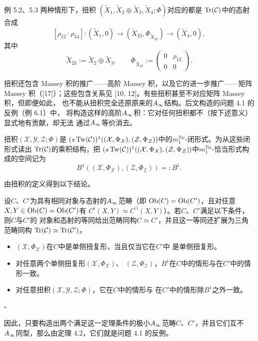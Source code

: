 例 5.2、5.3 两种情形下，扭积
$(\tilde{X}_{1},\tilde{X}_{2}\oplus\tilde{X}_{3},\tilde{X}_{4};\Phi)$对应的都是
$\operatorname{Tr}(\mathcal{C})$中的态射合成
\[
[\rho_{12}\cdot\rho_{34}]:(\tilde{X}_{1},0)\longrightarrow
(\tilde{X}_{23},\Phi_{\tilde{X}_{23}})\longrightarrow(\tilde{X}_{4},0),
\]
其中
\[
\tilde{X}_{23}:=\tilde{X}_{2}\oplus\tilde{X}_{3},\qquad
\Phi_{\tilde{X}_{23}}:=
\begin{pmatrix}0&\rho_{12}\\0&0\end{pmatrix}.
\]


扭积还包含 Massey 积的推广——高阶 Massey 积，以及它的进一步推广——矩阵
Massey 积（[17]）；这些包含关系见 [10, 12]。有些扭积甚至不对应矩阵 Massey 积，但即便如此，
也不能从扭积完全还原原来的$A_{\infty}$结构。后文构造的问题 4.1 的反例（例 6.1）中，
将构造这样的高阶$A_{\infty}$积：它对任何扭积都不（按下述意义）显式地有贡献，却无法
通过$A_{\infty}$等价消去。

扭积$(\mathcal{X},\mathcal{Y},\mathcal{Z};\Phi)$是
$(s\operatorname{Tw}(\mathcal{C}))^{1}((\mathcal{X},\Phi_{\mathcal{X}}),
(\mathcal{Z},\Phi_{\mathcal{Z}}))$中的$m_{1}^{Tw}$-闭形式。为从这些闭形式读出
$\operatorname{Tr}(\mathcal{C})$的乘积结构，把
$(s\operatorname{Tw}(\mathcal{C}))^{1}((\mathcal{X},\Phi_{\mathcal{X}}),
(\mathcal{Z},\Phi_{\mathcal{Z}}))$中$m_{1}^{Tw}$-恰当形式构成的空间记为
\[
B^{1}((\mathcal{X},\Phi_{\mathcal{X}}),(\mathcal{Z},\Phi_{\mathcal{Z}}))=:B^{1}.
\]

由扭积的定义得到以下结论。

\begin{theorem}\label{thm:c04-5.4}
设$C$、$C'$为具有相同对象与态射的$A_{\infty}$范畴（即
$\operatorname{Ob}(C)=\operatorname{Ob}(C')$，且对任意$X,Y\in\operatorname{Ob}(C)=\operatorname{Ob}(C')$有
$C^{i}(X,Y)\simeq C^{\prime i}(X,Y)$）。若$C$、$C'$满足以下条件，则$C$与$C'$的
对象和态射的等同给出范畴同构$C\simeq C'$，并且这一等同还扩展为三角范畴同构
$\operatorname{Tr}(\mathcal{C})\simeq\operatorname{Tr}(\mathcal{C}')$。
\begin{itemize}[leftmargin=1.6em,itemsep=2pt,topsep=3pt]
\item $(\mathcal{X},\Phi_{\mathcal{X}})$在$C$中是单侧扭复形，当且仅当它在$C'$中
是单侧扭复形。
\item 对任意两个单侧扭复形$(\mathcal{X},\Phi_{\mathcal{X}})$、
$(\mathcal{Z},\Phi_{\mathcal{Z}})$，$B^{1}$在$C$中的情形与在$C'$中的情形一致。
\item 对任意扭积$(\mathcal{X},\mathcal{Y},\mathcal{Z};\Phi)$，它在$C$中的情形与
在$C'$中的情形除$B^{1}$之外一致。
\end{itemize}
\hfill$\square$
\end{theorem}

因此，只要构造出两个满足这一定理条件的极小$A_{\infty}$范畴$C$、$C'$，并且它们互不
$A_{\infty}$同型，那么由定理 4.2，它们就是问题 4.1 的反例。
